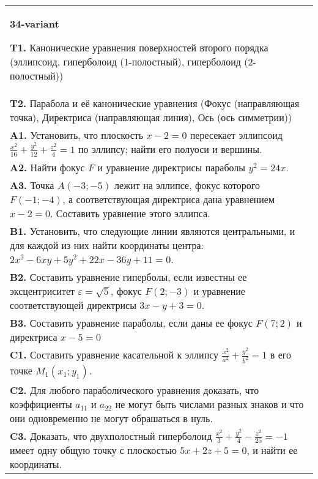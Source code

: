 \documentclass{article}
\begin{document}
\begin{tabular}{m{17cm}}
\textbf{34-variant}
\newline

\textbf{T1.} Канонические уравнения поверхностей второго порядка (эллипсоид, гиперболоид (1-полостный), гиперболоид (2-полостный)) \\
\textbf{T2.} Парабола и её канонические уравнения (Фокус (направляющая точка), Директриса (направляющая линия), Ось (ось симметрии)) \\
\textbf{A1.} Установить, что плоскость $x-2=0$ пересекает эллипсоид $\frac{x^2}{16}+\frac{y^2}{12}+\frac{z^2}{4}=1$ по эллипсу; найти его полуоси и вершины. \\
\textbf{A2.} Найти фокус $F$ и уравнение директрисы параболы $y^2=24 x$. \\
\textbf{A3.} Точка $A(-3 ;-5)$ лежит на эллипсе, фокус которого $F(-1 ;-4)$, а соответствующая директриса дана уравнением $x-2=0$. Составить уравнение этого эллипса. \\
\textbf{B1.} Установить, что следующие линии являются центральными, и для каждой из них найти координаты центра: $2 x^2-6 x y+5 y^2+22 x-36 y+11=0$. \\
\textbf{B2.} Составить уравнение гиперболы, если известны ее эксцентриситет $\varepsilon=\sqrt{5}$, фокус $F(2 ;-3)$ и уравнение соответствующей директрисы $3 x-y+3=0$. \\
\textbf{B3.} Составить уравнение параболы, если даны ее фокус $F(7 ; 2)$ и директриса $x-5=0$ \\
\textbf{C1.} Составить уравнение касательной к эллипсу $\frac{x^2}{a^2}+\frac{y^2}{b^2}=1$ в его точке $M_1\left(x_1 ; y_1\right)$. \\
\textbf{C2.} Для любого параболического уравнения доказать, что коэффициенты $a_{11}$ и $a_{22}$ не могут быть числами разных знаков и что они одновременно не могут обрашаться в нуль. \\
\textbf{C3.} Доказать, что двухполостный гиперболоид $\frac{x^2}{3}+\frac{y^2}{4}-\frac{z^2}{25}=-1$ имеет одну общую точку с плоскостью $5 x+2 z+5=0$, и найти ее координаты. \\

\end{tabular}
\vspace{1cm}
\end{document}
